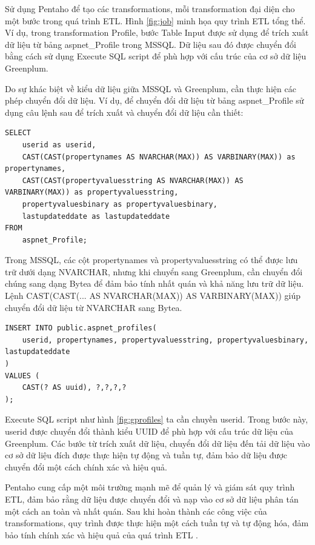 \documentclass[14pt]{article}
\begin{document}
Sử dụng Pentaho để tạo các transformations, mỗi transformation đại diện cho một bước trong quá trình ETL. Hình \ref{fig:job} minh họa quy trình ETL tổng thể. Ví dụ, trong transformation Profile, bước Table Input được sử dụng để trích xuất dữ liệu từ bảng aspnet\_Profile trong MSSQL. Dữ liệu sau đó được chuyển đổi bằng cách sử dụng Execute SQL script để phù hợp với cấu trúc của cơ sở dữ liệu Greenplum.

Do sự khác biệt về kiểu dữ liệu giữa MSSQL và Greenplum, cần thực hiện các phép chuyển đổi dữ liệu. Ví dụ, để chuyển đổi dữ liệu từ bảng aspnet\_Profile sử dụng câu lệnh sau để trích xuất và chuyển đổi dữ liệu cần thiết:

\begin{verbatim}
SELECT
    userid as userid,
    CAST(CAST(propertynames AS NVARCHAR(MAX)) AS VARBINARY(MAX)) as propertynames,
    CAST(CAST(propertyvaluesstring AS NVARCHAR(MAX)) AS VARBINARY(MAX)) as propertyvaluesstring,
    propertyvaluesbinary as propertyvaluesbinary, 
    lastupdateddate as lastupdateddate
FROM
    aspnet_Profile;
\end{verbatim} 

Trong MSSQL, các cột propertynames và propertyvaluesstring có thể được lưu trữ dưới dạng NVARCHAR, nhưng khi chuyển sang Greenplum, cần chuyển đổi chúng sang dạng Bytea để đảm bảo tính nhất quán và khả năng lưu trữ dữ liệu. Lệnh CAST(CAST(... AS NVARCHAR(MAX)) AS VARBINARY(MAX)) giúp chuyển đổi dữ liệu từ NVARCHAR sang Bytea.

\begin{verbatim}
INSERT INTO public.aspnet_profiles(
    userid, propertynames, propertyvaluesstring, propertyvaluesbinary, lastupdateddate
)
VALUES (
    CAST(? AS uuid), ?,?,?,?
);
\end{verbatim}

Execute SQL script như hình \ref{fig:gprofiles} ta cần chuyền userid. Trong bước này, userid được chuyển đổi thành kiểu UUID để phù hợp với cấu trúc dữ liệu của Greenplum. Các bước từ trích xuất dữ liệu, chuyển đổi dữ liệu đến tải dữ liệu vào cơ sở dữ liệu đích được thực hiện tự động và tuần tự, đảm bảo dữ liệu được chuyển đổi một cách chính xác và hiệu quả.

Pentaho cung cấp một môi trường mạnh mẽ để quản lý và giám sát quy trình ETL, đảm bảo rằng dữ liệu được chuyển đổi và nạp vào cơ sở dữ liệu phân tán một cách an toàn và nhất quán. Sau khi hoàn thành các công việc của transformations, quy trình được thực hiện một cách tuần tự và tự động hóa, đảm bảo tính chính xác và hiệu quả của quá trình ETL .
\end{document}
